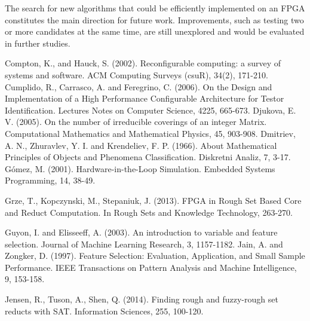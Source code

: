 \documentclass[authoryear,preprint,review,12pt]{elsarticle}
\begin{document}
The search for new algorithms that could be efficiently implemented on an FPGA constitutes the main
direction for future work. Improvements, such as testing two or more candidates at the same time, are 
still unexplored and would be evaluated in further studies.







\begin{thebibliography}{00}

Compton, K., and Hauck, S. (2002). Reconfigurable computing: a survey of systems and software. ACM Computing Surveys (csuR), 34(2), 171-210.
 Cumplido, R., Carrasco, A. and Feregrino, C. (2006). On the Design and Implementation of a High Performance Configurable Architecture for Testor Identification. Lectures Notes on Computer Science, 4225, 665-673.
Djukova, E. V. (2005). On the number of irreducible coverings of an integer Matrix. Computational Mathematics and Mathematical Physics, 45, 903-908.
 Dmitriev, A. N.,  Zhuravlev, Y. I. and Krendeliev, F. P. (1966). About Mathematical Principles of Objects and Phenomena Classification. Diskretni Analiz, 7, 3-17.
G\'omez, M. (2001). Hardware-in-the-Loop Simulation. Embedded Systems Programming, 14, 38-49.

Grze, T., Kopczynski, M., Stepaniuk, J. (2013). FPGA in Rough Set Based Core and Reduct Computation. In Rough Sets and Knowledge Technology, 263-270.

Guyon, I. and Elisseeff, A. (2003). An introduction to variable and feature selection. Journal of Machine Learning Research, 3, 1157-1182.
Jain, A. and Zongker, D. (1997). Feature Selection: Evaluation, Application, and Small Sample Performance. IEEE Transactions on Pattern Analysis and Machine Intelligence, 9, 153-158.

Jensen, R., Tuson, A., Shen, Q. (2014). Finding rough and fuzzy-rough set reducts with SAT. Information Sciences, 255, 100-120.


\end{thebibliography}
\end{document}
